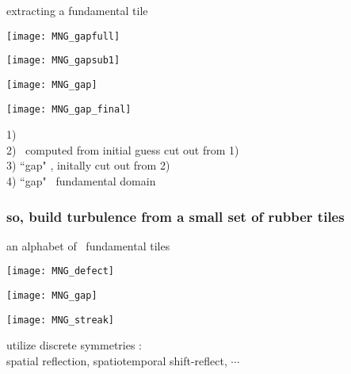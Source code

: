 \begin{frame}{extracting a fundamental tile}
\begin{minipage}[height=.60\textheight]{.24\textheight}
\centering %
\texttt{[image: MNG\_gapfull]}
\end{minipage} \quad
\begin{minipage}[height=.60\textheight]{.24\textheight}
\centering %
\texttt{[image: MNG\_gapsub1]}
\end{minipage} \quad
\begin{minipage}[height=.60\textheight]{.18\textheight}
\centering             %
\texttt{[image: MNG\_gap]}
\end{minipage} \quad
\begin{minipage}[height=.60\textheight]{.12\textheight}
\centering %
\texttt{[image: MNG\_gap\_final]}
\end{minipage}

1) \twot\ %
    \\
2) \twot\ computed from initial guess cut out from 1)
    \\
3) ``gap" \twot, %
     initally cut out from 2)
     \\
4) ``gap" \twot\ fundamental domain
\end{frame}

\begin{frame}%
  \frametitle{so, build turbulence from a small set of rubber tiles}
  \begin{block} {an alphabet of \KS\ fundamental tiles}
\begin{minipage}[height=.60\textheight]{.25\textheight}
\centering             %
\texttt{[image: MNG\_defect]}
\end{minipage} \quad\quad
\begin{minipage}[height=.60\textheight]{.25\textheight}
\texttt{[image: MNG\_gap]}
\end{minipage} \qquad\qquad
\begin{minipage}[height=.60\textheight]{.25\textheight}
\centering             %
\texttt{[image: MNG\_streak]}
\end{minipage}
  \end{block}
\vfill
utilize discrete symmetries : \\
spatial reflection, spatiotemporal shift-reflect,
$\cdots$
\end{frame}

